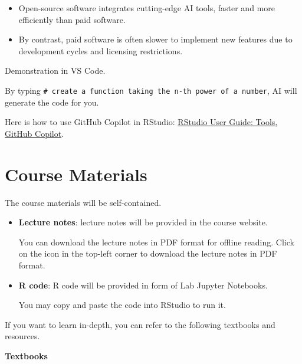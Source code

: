 \documentclass[
  12pt,
  a4paper,
]{scrbook}
\providecommand{\tightlist}{%
  \setlength{\itemsep}{0pt}\setlength{\parskip}{0pt}}
\renewcommand{\tightlist}{\setlength{\itemsep}{0.5\baselineskip}\setlength{\parskip}{0.2\baselineskip}}
\theoremstyle{plain}
\theoremstyle{definition}
\theoremstyle{remark}
\begin{document}
\begin{itemize}
\tightlist
\item
  Open-source software integrates cutting-edge AI tools, faster and more
  efficiently than paid software.
\item
  By contrast, paid software is often slower to implement new features
  due to development cycles and licensing restrictions.
\end{itemize}

{ Demonstration in VS Code. }

By typing
\texttt{\#\ create\ a\ function\ taking\ the\ n-th\ power\ of\ a\ number},
AI will generate the code for you.

Here is how to use GitHub Copilot in RStudio:
\href{https://docs.posit.co/ide/user/ide/guide/tools/copilot.html\#using-copilot}{RStudio
User Guide: Tools, GitHub Copilot}.

\section{Course Materials}\label{course-materials}

The course materials will be self-contained.

\begin{itemize}
\item
  \textbf{Lecture notes}: lecture notes will be provided in the course
  website.

  You can download the lecture notes in PDF format for offline reading.
  Click on the icon in the top-left corner to download the lecture notes
  in PDF format.
\item
  \textbf{R code}: R code will be provided in form of Lab Jupyter
  Notebooks.

  You may copy and paste the code into RStudio to run it.
\end{itemize}

If you want to learn in-depth, you can refer to the following textbooks
and resources.

\textbf{Textbooks}
\end{document}
